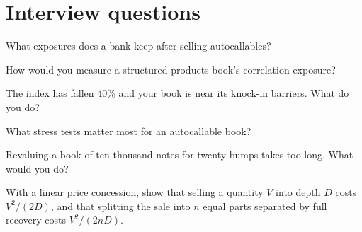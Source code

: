 \section{Interview questions}

\begin{interviewq}\label{iq:s2:hedging-a-structured-products-book:1}
What exposures does a bank keep after selling autocallables?
\end{interviewq}

\begin{interviewq}\label{iq:s2:hedging-a-structured-products-book:2}
How would you measure a structured-products book's correlation exposure?
\end{interviewq}

\begin{interviewq}\label{iq:s2:hedging-a-structured-products-book:3}
The index has fallen 40\% and your book is near its knock-in barriers. What do you do?
\end{interviewq}

\begin{interviewq}\label{iq:s2:hedging-a-structured-products-book:4}
What stress tests matter most for an autocallable book?
\end{interviewq}

\begin{interviewq}\label{iq:s2:hedging-a-structured-products-book:5}
Revaluing a book of ten thousand notes for twenty bumps takes too long. What would you do?
\end{interviewq}

\begin{interviewq}\label{iq:s2:hedging-a-structured-products-book:6}
With a linear price concession, show that selling a quantity $V$ into depth $D$ costs $V^2/(2D)$, and that splitting the sale into $n$ equal parts
separated by full recovery costs $V^2/(2nD)$.
\end{interviewq}
